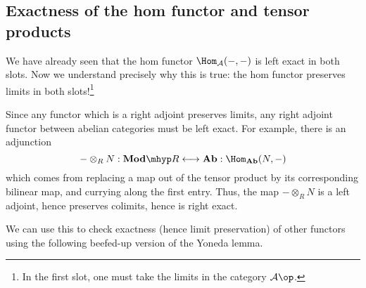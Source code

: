 \documentclass[main.tex]{subfiles}
\begin{document}
\subsection{Exactness of the hom functor and tensor products}
\label{ssc:exactness_of_the_hom_functor_and_tensor_products}

We have already seen that the hom functor $\Hom_{\mathcal{A}}(-,-)$ is left exact in both slots. Now we understand precisely why this is true: the hom functor preserves limits in both slots!\footnote{In the first slot, one must take the limits in the category $\mathcal{A}\op$.}

Since any functor which is a right adjoint preserves limits, any right adjoint functor between abelian categories must be left exact. For example, there is an adjunction
\begin{equation*}
  - \otimes_{R} N : \mathbf{Mod}\mhyp R \longleftrightarrow \mathbf{Ab} : \Hom_{\mathbf{Ab}}(N, -)
\end{equation*}
which comes from replacing a map out of the tensor product by its corresponding bilinear map, and currying along the first entry. Thus, the map $- \otimes_{R} N$ is a left adjoint, hence preserves colimits, hence is right exact.

We can use this to check exactness (hence limit preservation) of other functors using the following beefed-up version of the Yoneda lemma.
\end{document}
